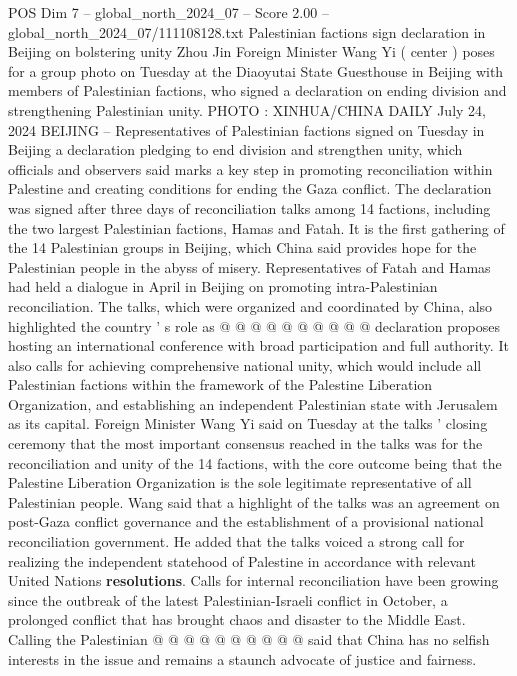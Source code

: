 \begin{textsample}{POS Dim 7 – global\_north\_2024\_07 – Score 2.00 – global\_north\_2024\_07/111108128.txt}  \label{ex:f7_pos_331}
Palestinian factions sign declaration in Beijing on bolstering unity Zhou Jin Foreign Minister Wang Yi ( center ) poses for a group photo on Tuesday at the Diaoyutai State Guesthouse in Beijing with members of Palestinian factions, who signed a declaration on ending division and strengthening Palestinian unity.
PHOTO : XINHUA/CHINA DAILY July 24, 2024 BEIJING -- Representatives of Palestinian factions signed on Tuesday in Beijing a declaration pledging to end division and strengthen unity, which officials and observers said marks a key step in promoting reconciliation within Palestine and creating conditions for ending the Gaza conflict.
The declaration was signed after three days of reconciliation talks among 14 factions, including the two largest Palestinian factions, Hamas and Fatah.
It is the first gathering of the 14 Palestinian groups in Beijing, which China said provides hope for the Palestinian people in the abyss of misery.
Representatives of Fatah and Hamas had held a dialogue in April in Beijing on promoting intra-Palestinian reconciliation.
The talks, which were organized and coordinated by China, also highlighted the country ' s role as @ @ @ @ @ @ @ @ @ @ declaration proposes hosting an international conference with broad participation and full authority.
It also calls for achieving comprehensive national unity, which would include all Palestinian factions within the framework of the Palestine Liberation Organization, and establishing an independent Palestinian state with Jerusalem as its capital.
Foreign Minister Wang Yi said on Tuesday at the talks ' closing ceremony that the most important consensus reached in the talks was for the reconciliation and unity of the 14 factions, with the core outcome being that the Palestine Liberation Organization is the sole legitimate representative of all Palestinian people.
Wang said that a highlight of the talks was an agreement on post-Gaza conflict governance and the establishment of a provisional national reconciliation government.
He added that the talks voiced a strong call for realizing the independent statehood of Palestine in accordance with relevant United Nations \textbf{resolutions}.
Calls for internal reconciliation have been growing since the outbreak of the latest Palestinian-Israeli conflict in October, a prolonged conflict that has brought chaos and disaster to the Middle East.
Calling the Palestinian @ @ @ @ @ @ @ @ @ @ said that China has no selfish interests in the issue and remains a staunch advocate of justice and fairness.

\end{textsample}
